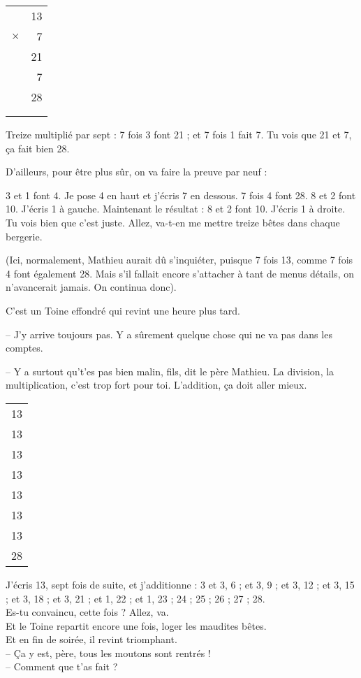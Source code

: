 {\begin{floatingtable}[r]{
\begin{tabular}{rr}
&{\large 13} \\
$\times$& {\large  7}\\
\hline
 & {\large 21}\\
 & {\large 7}\\
\hline
 & {\large 28}\\
 & \\
\multicolumn{2}{c}{} \\
\end{tabular} }\end{floatingtable}
     Treize multipli\'e par sept : 7 fois 3 font 21 ; et 7 fois 1
     fait 7. Tu vois que 21 et 7, \c ca fait bien 28.

 D'ailleurs, pour \^etre plus s\^ur, on va faire la preuve par neuf :

 3 et 1 font 4. Je pose 4 en haut et j'\'ecris 7 en dessous.
 7 fois 4 font 28. 8 et 2 font 10. J'\'ecris 1 \`a gauche.
 Maintenant le r\'esultat : 8 et 2 font 10. J'\'ecris 1 \`a droite.
 Tu vois bien que c'est juste. Allez, va-t-en me mettre treize
 b\^etes dans chaque bergerie.

 (Ici, normalement, Mathieu aurait d\^u s'inqui\'eter, puisque 7
 fois 13, comme 7 fois 4 font \'egalement 28. Mais s'il fallait
 encore s'attacher \`a tant de menus d\'etails, on n'avancerait
 jamais. On continua donc).

C'est un Toine effondr\'e qui revint une heure plus tard. 

-- J'y arrive toujours pas. Y a s\^urement quelque chose qui ne va pas dans les
comptes.

-- Y a surtout qu't'es pas bien malin, fils, dit le p\`ere Mathieu. La division,
la multiplication, c'est trop fort pour toi. L'addition, \c ca doit aller mieux.

\begin{floatingtable}[r]{
\begin{tabular}{c}
13\\
13\\
13\\
13\\
13\\
13\\
13\\
\cline{1-1}
28\\
\end{tabular} }\end{floatingtable}
                J'\'ecris 13, sept fois de suite, et j'additionne : 3 et 3, 6 ;
et 3, 9 ; et 3, 12 ; et 3, 15 ; et 3, 18 ; et 3, 21 ; et 1, 22 ;
et 1,  23 ; 24 ; 25 ; 26 ; 27 ; 28.\\
			    Es-tu convaincu, cette fois ? Allez, va.\\
	    Et le Toine repartit encore une fois, loger les maudites b\^etes.\\
		    Et en fin de soir\'ee, il revint triomphant.\\
		--  \c Ca y est, p\`ere, tous les moutons sont rentr\'es !\\
			    -- Comment que t'as fait ?

}
